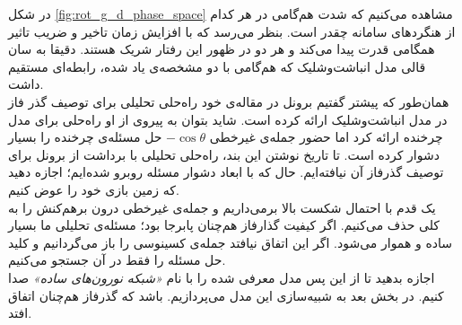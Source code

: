 در شکل \ref{fig:rot_g_d_phase_space} مشاهده می‌کنیم که شدت هم‌گامی در هر کدام از هنگردهای سامانه چقدر است. بنظر می‌رسد که با افزایش زمان تاخیر و ضریب تاثیر همگامی قدرت پیدا می‌کند و هر دو در ظهور این رفتار شریک هستند. دقیقا به سان قالی مدل انباشت‌وشلیک که هم‌گامی با دو مشخصه‌ی یاد شده، رابطه‌ای مستقیم داشت.\\

همان‌طور که پیشتر گفتیم برونل در مقاله‌ی خود 
\cite{brunel2000dynamics}
راه‌حلی تحلیلی برای توصیف گذر فاز در مدل انباشت‌وشلیک ارائه کرده است. شاید بتوان به پیروی از او راه‌حلی برای مدل چرخنده ارائه کرد اما حضور جمله‌ی غیرخطی
$- \cos\theta$
حل مسئله‌ی چرخنده‌ را بسیار دشوار کرده است. تا تاریخ نوشتن این بند، راه‌حلی تحلیلی با برداشت از برونل برای توصیف گذرفاز آن نیافته‌ایم. حال که با ابعاد دشوار مسئله روبرو شده‌ایم؛ اجازه دهید که زمین بازی خود را عوض کنیم.\\

یک قدم با احتمال شکست بالا برمی‌داریم و جمله‌ی غیرخطی درون برهم‌کنش را به کلی حذف می‌کنیم. اگر کیفیت گذارفاز هم‌چنان پابرجا بود؛ مسئله‌ی تحلیلی ما بسیار ساده و هموار می‌شود. اگر این اتفاق نیافتد جمله‌ی کسینوسی را باز می‌گردانیم و کلید حل مسئله را فقط در آن جستجو می‌کنیم.\\

اجازه بدهید تا از این پس مدل معرفی شده را با نام 
\emph{
«شبکه‌ نورون‌های ساده»
}
صدا کنیم. در بخش بعد به شبیه‌سازی این مدل می‌پردازیم. باشد که گذرفاز هم‌چنان اتفاق افتد.
